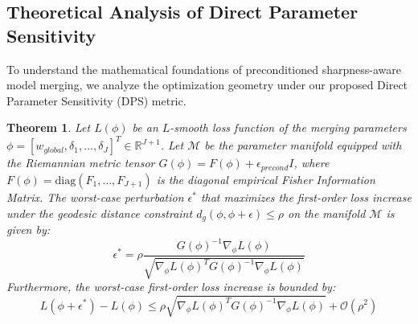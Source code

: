 \documentclass{article}
\theoremstyle{plain}
\newtheorem{theorem}{Theorem}[section]
\theoremstyle{definition}
\theoremstyle{remark}
\begin{document}
\subsection{Theoretical Analysis of Direct Parameter Sensitivity}
\label{sec:theory}

To understand the mathematical foundations of preconditioned sharpness-aware model merging, we analyze the optimization geometry under our proposed Direct Parameter Sensitivity (DPS) metric.

\begin{theorem}
\label{thm:riemannian}
Let $L(\phi)$ be an $L$-smooth loss function of the merging parameters $\phi = [w_{global}, \delta_1, \dots, \delta_J]^T \in \mathbb{R}^{J+1}$. Let $\mathcal{M}$ be the parameter manifold equipped with the Riemannian metric tensor $G(\phi) = F(\phi) + \epsilon_{precond} I$, where $F(\phi) = \mathrm{diag}(F_1, \dots, F_{J+1})$ is the diagonal empirical Fisher Information Matrix.
The worst-case perturbation $\epsilon^*$ that maximizes the first-order loss increase under the geodesic distance constraint $d_g(\phi, \phi + \epsilon) \leq \rho$ on the manifold $\mathcal{M}$ is given by:
\begin{equation}
  \epsilon^* = \rho \frac{G(\phi)^{-1} \nabla_{\phi} L(\phi)}{\sqrt{\nabla_{\phi} L(\phi)^T G(\phi)^{-1} \nabla_{\phi} L(\phi)}}
\end{equation}
Furthermore, the worst-case first-order loss increase is bounded by:
\begin{equation}
  L(\phi + \epsilon^*) - L(\phi) \leq \rho \sqrt{\nabla_{\phi} L(\phi)^T G(\phi)^{-1} \nabla_{\phi} L(\phi)} + \mathcal{O}(\rho^2)
\end{equation}
\end{theorem}
\end{document}
